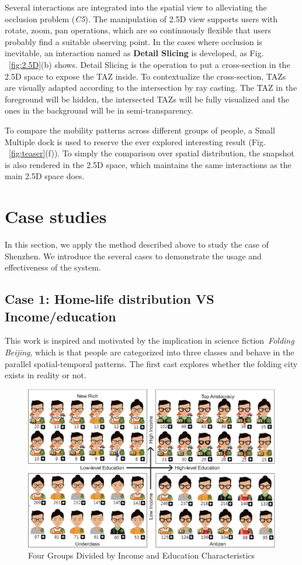 \documentclass{ieeeaccess}
\begin{document}
Several interactions are integrated into the spatial view to alleviating the occlusion problem (\textit{C5}). The manipulation of 2.5D view supports users with rotate, zoom, pan operations, which are so continuously flexible that users probably find a suitable observing point. In the cases where occlusion is inevitable, an interaction named as \textbf{Detail Slicing} is developed, as Fig. ~\ref{fig:2.5D}(b) shows. Detail Slicing is the operation to put a cross-section in the 2.5D space to expose the TAZ inside. To contextualize the cross-section, TAZs are visually adapted according to the intersection by ray casting. The TAZ in the foreground will be hidden, the intersected TAZs will be fully visualized and the ones in the background will be in semi-transparency.

 To compare the mobility patterns across different groups of people, a Small Multiple dock is used to reserve the ever explored interesting result (Fig. ~\ref{fig:teaser}(f)). To simply the comparison over spatial distribution, the snapshot is also rendered in the 2.5D space, which maintains the same interactions as the main 2.5D space does.


\section{Case studies}

In this section, we apply the method described above to study the case of Shenzhen. We introduce the several cases to demonstrate the usage and effectiveness of the system.

\subsection{Case 1: Home-life distribution VS Income/education}

This work is inspired and motivated by the implication in science fiction~\textit{Folding Beijing}, which is that people are categorized into three classes and behave in the parallel spatial-temporal patterns. The first cast explores whether the folding city exists in reality or not.

\begin{figure}[htb!]
 \centering
 \includegraphics[width=\columnwidth]{pictures/case1_1}
 \caption{Four Groups Divided by Income and Education Characteristics}
 \label{case11}
\end{figure}
\end{document}
